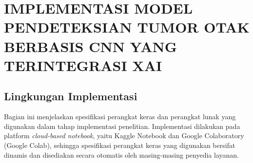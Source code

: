 \cleardoublepage
\chapter{IMPLEMENTASI MODEL PENDETEKSIAN TUMOR OTAK BERBASIS CNN YANG TERINTEGRASI XAI}
\label{chap:implementasi}

\section{Lingkungan Implementasi}
Bagian ini menjelaskan spesifikasi perangkat keras dan perangkat lunak yang digunakan dalam tahap implementasi penelitian. Implementasi dilakukan pada platform \textit{cloud-based notebook}, yaitu Kaggle Notebook dan Google Colaboratory (Google Colab), sehingga spesifikasi perangkat keras yang digunakan bersifat dinamis dan disediakan secara otomatis oleh masing-masing penyedia layanan.

